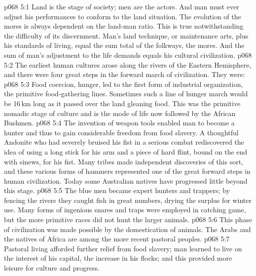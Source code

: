 \vs p068 5:1 Land is the stage of society; men are the actors. And man must ever adjust his performances to conform to the land situation. The evolution of the mores is always dependent on the land\hyp{}man ratio. This is true notwithstanding the difficulty of its discernment. Man’s land technique, or maintenance arts, plus his standards of living, equal the sum total of the folkways, the mores. And the sum of man’s adjustment to the life demands equals his cultural civilization.
\vs p068 5:2 The earliest human cultures arose along the rivers of the Eastern Hemisphere, and there were four great steps in the forward march of civilization. They were:
\vs p068 5:3 \bibnobreakspace {} Food coercion, hunger, led to the first form of industrial organization, the primitive food\hyp{}gathering lines. Sometimes such a line of hunger march would be 16\,km long as it passed over the land gleaning food. This was the primitive nomadic stage of culture and is the mode of life now followed by the African Bushmen.
\vs p068 5:4 \bibnobreakspace {} The invention of weapon tools enabled man to become a hunter and thus to gain considerable freedom from food slavery. A thoughtful Andonite who had severely bruised his fist in a serious combat rediscovered the idea of using a long stick for his arm and a piece of hard flint, bound on the end with sinews, for his fist. Many tribes made independent discoveries of this sort, and these various forms of hammers represented one of the great forward steps in human civilization. Today some Australian natives have progressed little beyond this stage.
\vs p068 5:5 The blue men became expert hunters and trappers; by fencing the rivers they caught fish in great numbers, drying the surplus for winter use. Many forms of ingenious snares and traps were employed in catching game, but the more primitive races did not hunt the larger animals.
\vs p068 5:6 \bibnobreakspace {} This phase of civilization was made possible by the domestication of animals. The Arabs and the natives of Africa are among the more recent pastoral peoples.
\vs p068 5:7 Pastoral living afforded further relief from food slavery; man learned to live on the interest of his capital, the increase in his flocks; and this provided more leisure for culture and progress.
